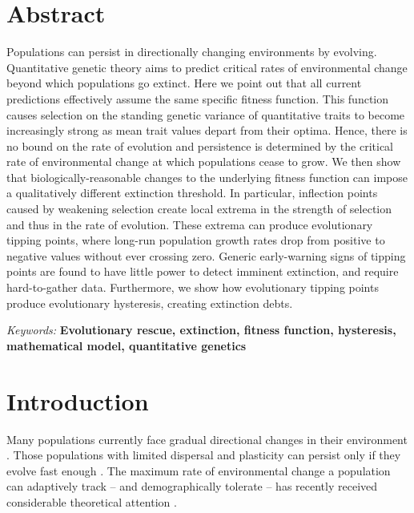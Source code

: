 \documentclass[12pt,letterpaper]{article} %
\begin{document}
\doublespacing
\linenumbers

\newpage
\setcounter{page}{1}
\pagestyle{fancy}

\normalsize

\section*{Abstract} %

Populations can persist in directionally changing environments by evolving. Quantitative genetic theory aims to predict critical rates of environmental change beyond which populations go extinct. Here we point out that all current predictions effectively assume the same specific fitness function. This function causes selection on the standing genetic variance of quantitative traits to become increasingly strong as mean trait values depart from their optima. Hence, there is no bound on the rate of evolution and persistence is determined by the critical rate of environmental change at which populations cease to grow. We then show that biologically-reasonable changes to the underlying fitness function can impose a qualitatively different extinction threshold. In particular, inflection points caused by weakening selection create local extrema in the strength of selection and thus in the rate of evolution. These extrema can produce evolutionary tipping points, where long-run population growth rates drop from positive to negative values without ever crossing zero. Generic early-warning signs of tipping points are found to have little power to detect imminent extinction, and require hard-to-gather data. Furthermore, we show how evolutionary tipping points produce evolutionary hysteresis, creating extinction debts. 

\noindent \textit{Keywords:} \textbf{Evolutionary rescue, extinction, fitness function, hysteresis, mathematical model, quantitative genetics}

\newpage
\section*{Introduction}

Many populations currently face gradual directional changes in their environment \citep[reviewed in][]{Davis2005,Parmesan2006,Visser2008,Lavergne2010,Hoffmann2011}.
Those populations with limited dispersal and plasticity can persist only if they evolve fast enough \citep{Lynch1993}.
The maximum rate of environmental change a population can adaptively track -- and demographically tolerate -- has recently received considerable theoretical attention \citep[reviewed in][]{Walters2012,Kopp2013,Alexander2014}. 
\end{document}
